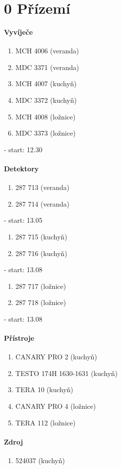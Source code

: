 \documentclass[11pt,a4paper]{article}
\begin{document}
\section*{0 Přízemí}
\paragraph{Vyvíječe}
	\begin{enumerate}
	\item MCH 4006 (veranda)
	\item MDC 3371 (veranda)
	\item MCH 4007 (kuchyň)
	\item MDC 3372 (kuchyň)
	\item MCH 4008 (ložnice)
	\item MDC 3373 (ložnice)
	\end{enumerate}
- start: 12.30
\paragraph{Detektory}
	\begin{enumerate}
	\item 287 713 (veranda)
	\item 287 714 (veranda)
	\end{enumerate}
- start: 13.05
\begin{enumerate}
	\item 287 715 (kuchyň)
	\item 287 716 (kuchyň)
\end{enumerate}
- start: 13.08
\begin{enumerate}
	\item 287 717 (ložnice)
	\item 287 718 (ložnice)
\end{enumerate}
- start: 13.08
\paragraph{Přístroje}
	\begin{enumerate}
	\item CANARY PRO 2 (kuchyň)
	\item TESTO 174H 1630-1631 (kuchyň)
	\item TERA 10 (kuchyň)
	\item CANARY PRO 4 (ložnice)
	\item TERA 112 (ložnice)
	\end{enumerate}
\paragraph{Zdroj}
	\begin{enumerate}
	\item 524037 (kuchyň)
	\end{enumerate}
\end{document}
